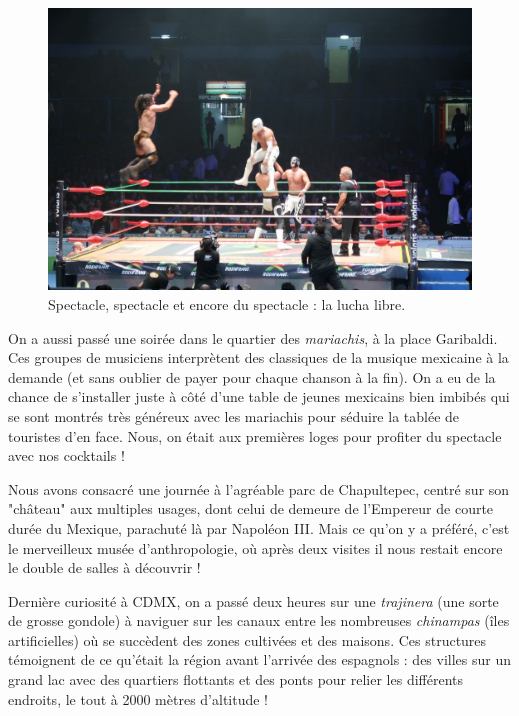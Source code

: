 \begin{figure}
\centering
\includegraphics{images/20180930_luchalibre.JPG}
\caption{Spectacle, spectacle et encore du spectacle : la lucha libre.}
\end{figure}

On a aussi passé une soirée dans le quartier des \emph{mariachis}, à la
place Garibaldi. Ces groupes de musiciens interprètent des classiques de
la musique mexicaine à la demande (et sans oublier de payer pour chaque
chanson à la fin). On a eu de la chance de s'installer juste à côté
d'une table de jeunes mexicains bien imbibés qui se sont montrés très
généreux avec les mariachis pour séduire la tablée de touristes d'en
face. Nous, on était aux premières loges pour profiter du spectacle avec
nos cocktails !

Nous avons consacré une journée à l'agréable parc de Chapultepec, centré
sur son "château" aux multiples usages, dont celui de demeure de
l'Empereur de courte durée du Mexique, parachuté là par Napoléon III.
Mais ce qu'on y a préféré, c'est le merveilleux musée d'anthropologie,
où après deux visites il nous restait encore le double de salles à
découvrir !

Dernière curiosité à CDMX, on a passé deux heures sur une
\emph{trajinera} (une sorte de grosse gondole) à naviguer sur les canaux
entre les nombreuses \emph{chinampas} (îles artificielles) où se
succèdent des zones cultivées et des maisons. Ces structures témoignent
de ce qu'était la région avant l'arrivée des espagnols : des villes sur
un grand lac avec des quartiers flottants et des ponts pour relier les
différents endroits, le tout à 2000 mètres d'altitude !

